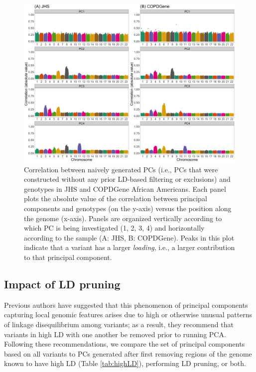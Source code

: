 \documentclass[12pt]{article}
\begin{document}
\begin{figure}
\center
\includegraphics[width=\textwidth]{figs/finalfigs/fig2_topmed_corr}
\caption{Correlation between naively generated PCs (i.e., PCs that were constructed without any prior LD-based filtering or exclusions) and genotypes in JHS and COPDGene African Americans. Each panel plots the absolute value of the correlation between principal components and genotypes (on the y-axis) versus the position along the genome (x-axis).  Panels are organized vertically according to which PC is being investigated (1, 2, 3, 4) and horizontally according to the sample (A: JHS, B: COPDGene). Peaks in this plot indicate that a variant has a larger \textit{loading}, i.e., a larger contribution to that principal component.}
\label{fig:corr-TOPMed}
\end{figure}


\subsection{Impact of LD pruning}

Previous authors have suggested that this phenomenon of principal components capturing local genomic features arises due to high or otherwise unusual patterns of linkage disequilibrium among variants; as a result, they recommend that variants in high LD with one another be removed prior to running PCA. 
Following these recommendations, we compare the set of principal components based on all variants to PCs generated after first removing regions of the genome known to have high LD (Table \ref{tab:highLD}), performing LD pruning, or both. 
\end{document}
